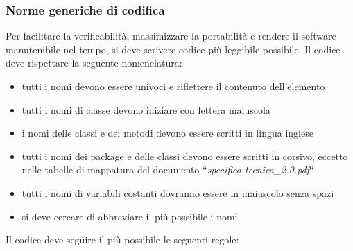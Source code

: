 \documentclass[a4paper,11pt]{article}
\begin{document}
\subsubsection{Norme generiche di codifica}
Per facilitare la verificabilit\`a, massimizzare la portabilit\`a e rendere il software manutenibile nel tempo, si deve scrivere codice pi\`u leggibile possibile. Il codice deve rispettare la seguente nomenclatura:
\begin{itemize}
\item tutti i nomi devono essere univoci e riflettere il contenuto dell'elemento
\item tutti i nomi di classe devono iniziare con lettera maiuscola
\item i nomi delle classi e dei metodi devono essere scritti in lingua inglese
\item tutti i nomi dei package e delle classi devono essere scritti in corsivo, eccetto nelle tabelle di mappatura del documento ``\textit{specifica-tecnica\_2.0.pdf}``
\item tutti i nomi di variabili costanti dovranno essere in maiuscolo senza spazi
\item si deve cercare di abbreviare il pi\`u possibile i nomi
\end{itemize}
Il codice deve seguire il pi\`u possibile le seguenti regole:
\end{document}
